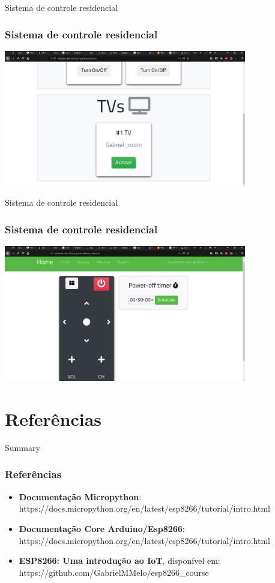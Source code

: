 \documentclass[10pt, compress]{beamer}
\begin{document}
\begin{frame}{Sistema de controle residencial}
  \frametitle{Sistema de controle residencial}
  \includegraphics[width=300pt]{images/iot-server_dash2.png}
\end{frame}

\begin{frame}{Sistema de controle residencial}
  \frametitle{Sistema de controle residencial}
  \includegraphics[width=300pt]{images/iot-server_remotecontrol.png}
\end{frame}
\section{Referências}

\begin{frame}{Summary}
  \frametitle{Referências}
  \begin{itemize}
    \item \textbf{Documentação Micropython}: https://docs.micropython.org/en/latest/esp8266/tutorial/intro.html \vspace{5pt}
    \item \textbf{Documentação Core Arduino/Esp8266}: https://docs.micropython.org/en/latest/esp8266/tutorial/intro.html \vspace{5pt}
    \item \textbf{ESP8266: Uma introdução ao IoT}, disponível em: https://github.com/GabrielMMelo/esp8266\_course
  \end{itemize}
\end{frame}

\end{document}

